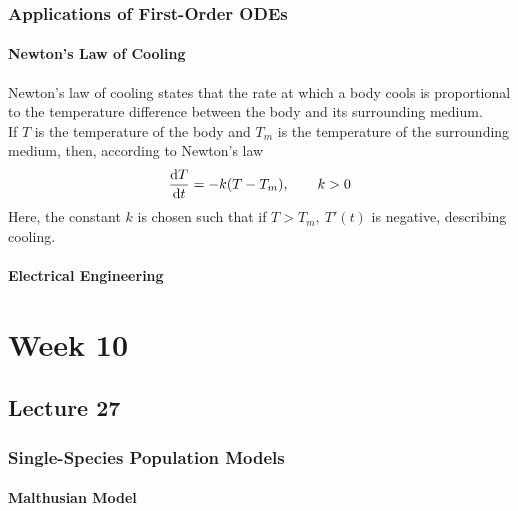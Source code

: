 \documentclass{report}
\begin{document}
\subsection*{Applications of First-Order ODEs}
\subsubsection*{Newton's Law of Cooling}
Newton's law of cooling states that the rate at which a body cools is proportional to the temperature difference between the body and its surrounding medium. \\

If $T$ is the temperature of the body and $T_m$ is the temperature of the surrounding medium, then, according to Newton's law
$$
	\dyd[T]{t} = -k(T-T_m),\qquad k > 0
$$
Here, the constant $k$ is chosen such that if $T > T_m,\ T'(t)$ is negative, describing cooling.

\subsubsection*{Electrical Engineering}

\chapter{Week 10}
\section{Lecture 27}
\subsection*{Single-Species Population Models}
\subsubsection*{Malthusian Model}
\end{document}
